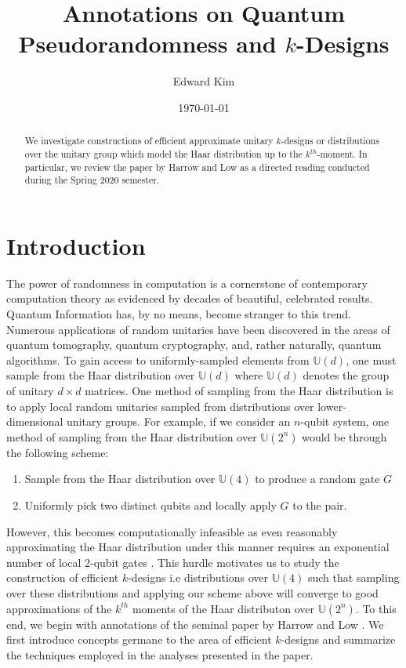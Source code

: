 \documentclass[12pt]{amsart}
\theoremstyle{definition}
\theoremstyle{remark}
\numberwithin{equation}{section}
\theoremstyle{remark}
\begin{document}
\title{Annotations on Quantum Pseudorandomness and $k$-Designs}
\author{Edward Kim}
\date{\today}
\maketitle

\begin{abstract}
  We investigate constructions of efficient approximate unitary $k$-designs or distributions over the unitary group which model the Haar distribution up to the $k^{th}$-moment. In particular, we review the paper by Harrow and Low as a directed reading conducted during the Spring 2020 semester.
\end{abstract}

\tableofcontents

\section{Introduction}

The power of randomness in computation is a cornerstone of contemporary computation theory as evidenced by decades of beautiful, celebrated results. Quantum Information has, by no means, become stranger to this trend. Numerous applications of random unitaries have been discovered in the areas of quantum tomography, quantum cryptography, and, rather naturally, quantum algorithms. To gain access to uniformly-sampled elements from $\mathbb{U}(d)$, one must sample from the Haar distribution over $\mathbb{U}(d)$ where $\mathbb{U}(d)$ denotes the group of unitary $d \times d$ matrices. One method of sampling from the Haar distribution is to apply local random unitaries sampled from distributions over lower-dimensional unitary groups. For example, if we consider an $n$-qubit system, one method of sampling from the Haar distribution over $\mathbb{U}(2^n)$ would be through the following scheme:
\begin{enumerate}
  \item Sample from the Haar distribution over $\mathbb{U}(4)$ to produce a random gate $G$
  \item Uniformly pick two distinct qubits and locally apply $G$ to the pair.
\end{enumerate}
However, this becomes computationally infeasible as even reasonably approximating the Haar distribution under this manner requires an exponential number of local 2-qubit gates \cite{knill}. This hurdle motivates us to study the construction of efficient $k$-designs i.e distributions over $\mathbb{U}(4)$ such that sampling over these distributions and applying our scheme above will converge to good approximations of the $k^{th}$ moments of the Haar distributon over $\mathbb{U}(2^n)$. To this end, we begin with annotations of the seminal paper by Harrow and Low \cite{harrlow}. We first introduce concepts germane to the area of efficient $k$-designs and summarize the techniques employed in the analyses presented in the paper.
\end{document}
